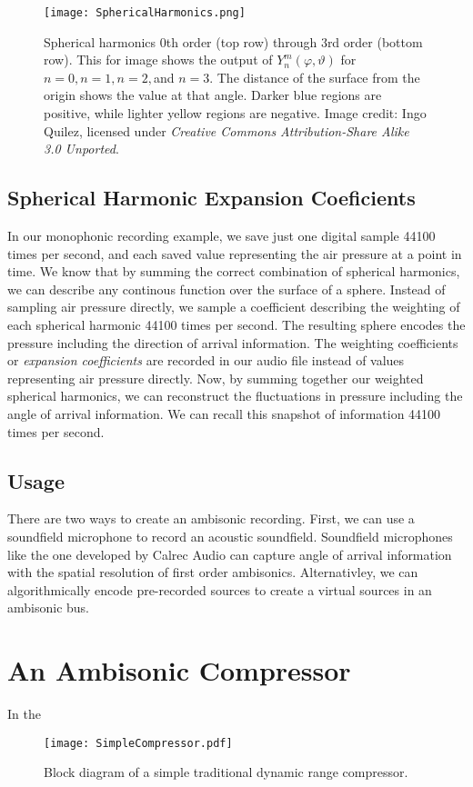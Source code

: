 \begin{figure}[]
  \texttt{[image: SphericalHarmonics.png]}
  \caption{Spherical harmonics $0$th order (top row) through $3$rd
    order (bottom row). This for image shows the output of
    $Y_{n}^{m}(\varphi,\vartheta)$ for $n=0,n=1,n=2,$and $n=3$. The
    distance of the surface from the origin shows the value at that
    angle. Darker blue regions are positive, while lighter yellow
    regions are negative. Image credit: Ingo Quilez, licensed under
    \textit{Creative Commons Attribution-Share Alike 3.0 Unported}.}
  \label{fig:spherical-harmonics}
\end{figure}

\subsection{Spherical Harmonic Expansion Coeficients}
\label{sec:spher-harm-expans}
In our monophonic recording example, we save just one digital sample
44100 times per second, and each saved value representing the air
pressure at a point in time. We know that by summing the correct
combination of spherical harmonics, we can describe any continous
function over the surface of a sphere. Instead of sampling air
pressure directly, we sample a coefficient describing the weighting of
each spherical harmonic 44100 times per second. The resulting sphere
encodes the pressure including the direction of arrival
information. The weighting coefficients or \textit{expansion
  coefficients} are recorded in our audio file instead of values
representing air pressure directly. Now, by summing together our
weighted spherical harmonics, we can reconstruct the fluctuations in
pressure including the angle of arrival information. We can recall
this snapshot of information 44100 times per second.

\subsection{Usage}
\label{sec:usage}
There are two ways to create an ambisonic recording. First, we can use
a soundfield microphone to record an acoustic soundfield. Soundfield
microphones like the one developed by Calrec Audio can capture angle
of arrival information with the spatial resolution of first order
ambisonics.\cite[-1in]{Ferrar1979} Alternativley, we can algorithmically
encode pre-recorded sources to create a virtual sources in an
ambisonic bus.\cite[-0.4in]{Malham1995}

\section{An Ambisonic Compressor}
\label{sec:ambis-compr}
In the 

\begin{figure*}
  \texttt{[image: SimpleCompressor.pdf]}
  \caption{Block diagram of a simple traditional dynamic range
    compressor.}
  \label{fig:comp-block}
\end{figure*}


